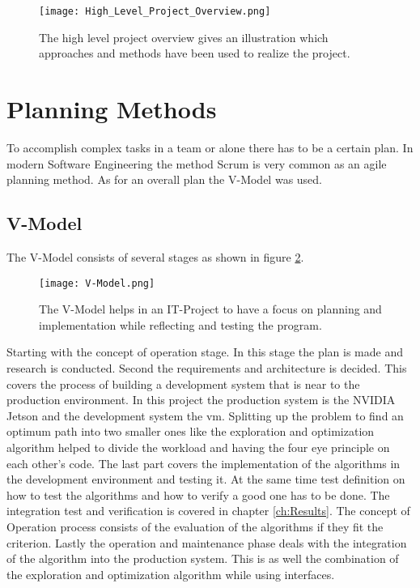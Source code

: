 \begin{figure}[H]
    \centering
    \texttt{[image: High\_Level\_Project\_Overview.png]}
    \caption{The high level project overview gives an illustration which approaches and methods have been used to realize the project.}
    \label{fig:High Level Project Overview}
\end{figure}

\section{Planning Methods} \label{sec:Planning Methods}
To accomplish complex tasks in a team or alone there has to be a certain plan. In modern Software Engineering the method Scrum is very common as an agile planning method. As for an overall plan the V-Model was used.

\subsection{V-Model} \label{sec:Planning Method: V-Model}
The V-Model consists of several stages as shown in figure \ref{fig:V-Model}. 
\begin{figure}[H]
    \centering
    \texttt{[image: V-Model.png]}
    \caption{The V-Model helps in an IT-Project to have a focus on planning and implementation while reflecting and testing the program.}
    \label{fig:V-Model}
\end{figure}

Starting with the concept of operation stage. In this stage the plan is made and research is conducted. Second the requirements and architecture is decided. This covers the process of building a development system that is near to the production environment. In this project the production system is the NVIDIA Jetson and the development system the \acrlong{vm}. Splitting up the problem to find an optimum path into two smaller ones like the exploration and optimization algorithm helped to divide the workload and having the four eye principle on each other's code. The last part covers the implementation of the algorithms in the development environment and testing it. At the same time test definition on how to test the algorithms and how to verify a good one has to be done. The integration test and verification is covered in chapter \ref{ch:Results}. The concept of Operation process consists of the evaluation of the algorithms if they fit the criterion. Lastly the operation and maintenance phase deals with the integration of the algorithm into the production system. This is as well the combination of the exploration and optimization algorithm while using interfaces.

